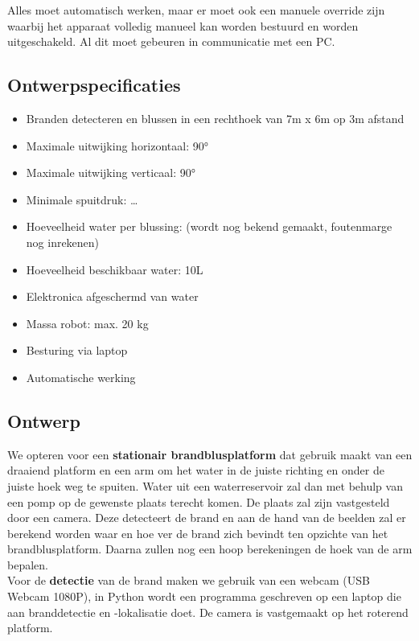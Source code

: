 \documentclass[kulak]{kulakarticle} %
\begin{document}
Alles moet automatisch werken, maar er moet ook een manuele override zijn waarbij het apparaat volledig manueel kan worden bestuurd en worden uitgeschakeld. Al dit moet gebeuren in communicatie met een PC. 



\subsection{Ontwerpspecificaties}
\begin{itemize}
	\item Branden detecteren en blussen in een rechthoek van 7m x 6m op 3m afstand 
	\item Maximale uitwijking horizontaal: 90°  
	\item Maximale uitwijking verticaal: 90°
	\item Minimale spuitdruk: … %
	\item Hoeveelheid water per blussing: (wordt nog bekend gemaakt, foutenmarge nog inrekenen) 
	\item Hoeveelheid beschikbaar water: 10L 
	\item Elektronica afgeschermd van water 
	\item Massa robot: max. 20 kg
	\item Besturing via laptop
	\item Automatische werking
\end{itemize}

\subsection{Ontwerp}
We opteren voor een \textbf{stationair brandblusplatform} dat gebruik maakt van een draaiend platform en een arm om het water in de juiste richting en onder de juiste hoek weg te spuiten. Water uit een waterreservoir zal dan met behulp van een pomp op de gewenste plaats terecht komen. De plaats zal zijn vastgesteld door een camera. Deze detecteert de brand en aan de hand van de beelden zal er berekend worden waar en hoe ver de brand zich bevindt ten opzichte van het brandblusplatform. Daarna zullen nog een hoop berekeningen de hoek van de arm bepalen. \\

Voor de \textbf{detectie} van de brand maken we gebruik van een webcam (USB Webcam 1080P), in Python wordt een programma geschreven op een laptop die aan branddetectie en -lokalisatie doet. De camera is vastgemaakt op het roterend platform. \\
\end{document}
